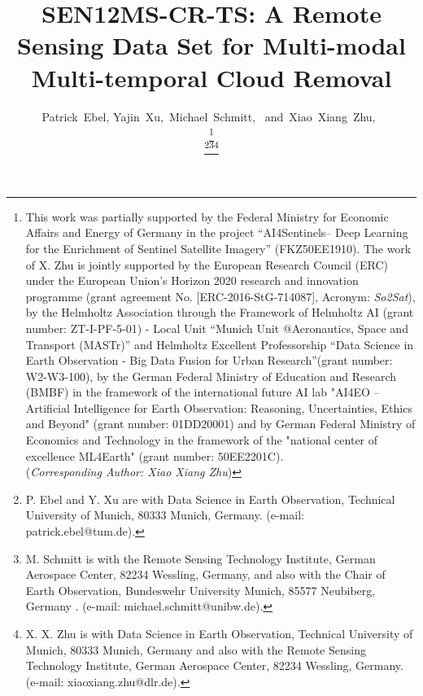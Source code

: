 \documentclass[journal]{IEEEtran}
\begin{document}
\title{SEN12MS-CR-TS: A Remote Sensing Data Set for Multi-modal Multi-temporal Cloud Removal}


\author{Patrick~Ebel, Yajin~Xu,~Michael~Schmitt,~
        and~Xiao~Xiang~Zhu,~


\thanks{This work was partially supported by the Federal Ministry for Economic Affairs and Energy of Germany in the project “AI4Sentinels– Deep Learning for the Enrichment of Sentinel Satellite Imagery” (FKZ50EE1910). The work of X. Zhu is jointly supported by the European Research Council (ERC) under the European Union's Horizon 2020 research and innovation programme (grant agreement No. [ERC-2016-StG-714087], Acronym: \textit{So2Sat}), by the Helmholtz Association
through the Framework of Helmholtz AI (grant  number:  ZT-I-PF-5-01) - Local Unit ``Munich Unit @Aeronautics, Space and Transport (MASTr)'' and Helmholtz Excellent Professorship ``Data Science in Earth Observation - Big Data Fusion for Urban Research''(grant number: W2-W3-100), by the German Federal Ministry of Education and Research (BMBF) in the framework of the international future AI lab "AI4EO -- Artificial Intelligence for Earth Observation: Reasoning, Uncertainties, Ethics and Beyond" (grant number: 01DD20001) and by German Federal Ministry of Economics and Technology in the framework of the "national center of excellence ML4Earth" (grant number: 50EE2201C).\\
(\textit{Corresponding Author: Xiao Xiang Zhu})} 

\thanks{P. Ebel and Y. Xu are with Data Science in Earth Observation, Technical
University of Munich, 80333 Munich, Germany. (e-mail: patrick.ebel@tum.de).}\thanks{M. Schmitt is with the Remote Sensing Technology Institute, German Aerospace Center, 82234 Wessling, Germany, and also with the Chair of Earth Observation, Bundeswehr University Munich, 85577 Neubiberg, Germany . (e-mail: michael.schmitt@unibw.de).}\thanks{X. X. Zhu is with Data Science in Earth Observation, Technical University of Munich, 80333 Munich, Germany and also with the Remote Sensing Technology Institute, German Aerospace Center, 82234 Wessling, Germany. (e-mail: xiaoxiang.zhu@dlr.de).}

}




\end{document}
